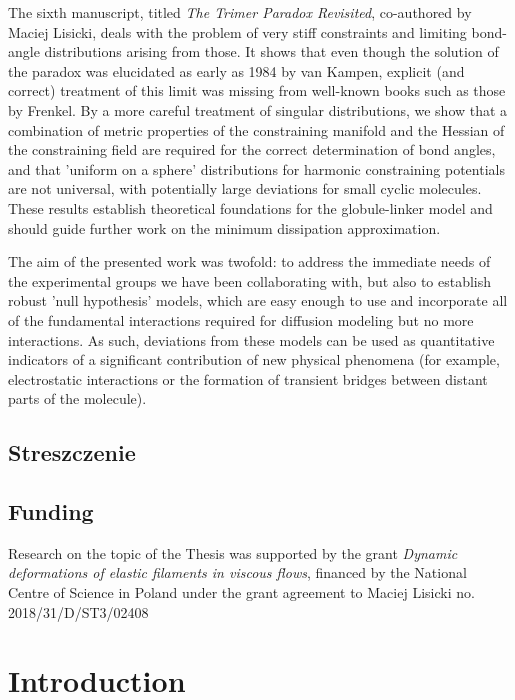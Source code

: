 \documentclass{doctoral}
\begin{document}
The sixth manuscript, titled \emph{The Trimer Paradox Revisited}, co-authored by Maciej Lisicki, deals with the problem of very stiff constraints and limiting bond-angle distributions arising from those.
It shows that even though the solution of the paradox was elucidated as early as 1984 by van Kampen, explicit (and correct) treatment of this limit was missing from well-known books such as those by Frenkel.
By a more careful treatment of singular distributions, we show that a combination of metric properties of the constraining manifold and the Hessian of the constraining field are required for the correct determination of bond angles, and that 'uniform on a sphere' distributions for harmonic constraining potentials are not universal, with potentially large deviations for small cyclic molecules.
These results establish theoretical foundations for the globule-linker model and should guide further work on the minimum dissipation approximation.

The aim of the presented work was twofold: to address the immediate needs of the experimental groups we have been collaborating with, but also to establish robust 'null hypothesis' models, which are easy enough to use and incorporate all of the fundamental interactions required for diffusion modeling but no more interactions.
As such, deviations from these models can be used as quantitative indicators of a significant contribution of new physical phenomena (for example, electrostatic interactions or the formation of transient bridges between distant parts of the molecule).
\clearpage

\section*{Streszczenie}

\clearpage

\section*{Funding}
Research on the topic of the Thesis was supported by the grant \emph{Dynamic deformations of elastic filaments in viscous flows}, financed by the National Centre of Science in Poland under the grant agreement to Maciej Lisicki no.
2018/31/D/ST3/02408
\clearpage

\tableofcontents

\chapter{Introduction}
\end{document}
